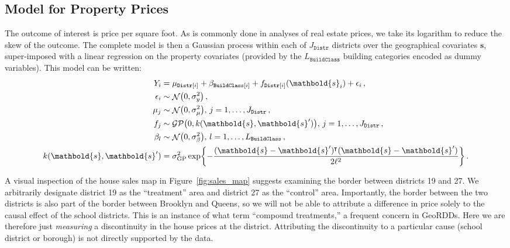 \documentclass[letter,12pt]{article}
\DeclarePairedDelimiter{\parenthesis}{\lparen}{\rparen}
\DeclarePairedDelimiter{\squarebracket}{\lbrack}{\rbrack}
\DeclarePairedDelimiter{\curlybracket}{\lbrace}{\rbrace}
\newcommand{\del}[1]{\parenthesis*{#1}}
\newcommand{\sbr}[1]{\squarebracket*{#1}}
\newcommand{\cbr}[1]{\curlybracket*{#1}}
\DeclareMathOperator{\normal}{\mathcal{N}}
\DeclareMathOperator{\GP}{\mathcal{GP}}
\newcommand{\building}{\mathtt{BuildClass}}
\newcommand{\district}{\mathtt{Distr}}
\newcommand*{\trans}{^{\mkern-1.5mu\intercal}}
\newcommand{\sigmaf}{\sigma_{\mathrm{GP}}}
\newcommand{\sigmamu}{\sigma_{\mu}}
\newcommand{\svec}{\mathbold{s}}
\newcommand{\eqlabel}[1]{\label{#1}}
\begin{document}
\hypertarget{model-for-property-prices}{%
\subsection{Model for Property Prices}\label{model-for-property-prices}}

The outcome of interest is price per square foot.
As is commonly done in analyses of real estate prices, we take its logarithm to reduce the skew of the outcome.
The complete model is then a Gaussian process within each of \(J_\district\) districts over the geographical covariates \(\svec\), super-imposed with a linear regression on the property covariates (provided by the \(L_\building\) building categories encoded as dummy variables).
This model can be written:
\begin{equation}
    \begin{split}
        Y_i &= %
        \mu_{\district\sbr{i}} + \beta_{\building\sbr{i}}
        + f_{\district\sbr{i}}(\svec_i) + \epsilon_i \,,
        \\
        \epsilon_i &\sim \normal\del{0, \sigma_y^2} \,, \\
        \mu_{j} &\sim \normal\del{0, \sigmamu^2},\,j=1,\dotsc,J_\district \,, \\
        f_j &\sim \GP\del{0, k(\svec, \svec')},\,j=1,\dotsc,J_\district \,, \\
        \beta_{l} &\sim \normal\del{0, \sigma_\beta^2},\,l=1,\dotsc,L_\building \,, \\
        k(\svec, \svec') &= \sigmaf^2 \exp\cbr{ - \frac{(\svec-\svec')\trans(\svec-\svec')}{2\ell^2}} \,.
    \end{split}
    \eqlabel{eq:nyc_model}
\end{equation}

A visual inspection of the house sales map in Figure~\ref{fig:sales_map} suggests examining the border between districts 19 and 27.
We arbitrarily designate district 19 as the ``treatment'' area and district 27 as the ``control'' area.
Importantly, the border between the two districts is also part of the border between Brooklyn and Queens, so we will not be able to attribute a difference in price solely to the causal effect of the school districts.
This is an instance of what \cite{keele_titiunik_2015} term ``compound treatments,'' a frequent concern in GeoRDDs.
Here we are therefore just \emph{measuring} a discontinuity in the house prices at the district.
Attributing the discontinuity to a particular cause (school district or borough) is not directly supported by the data.
\end{document}
